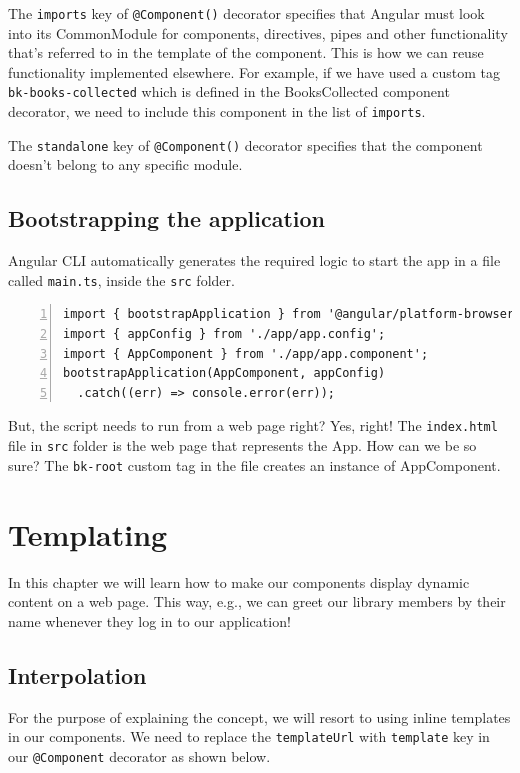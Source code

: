 \documentclass{report}
\begin{document}
The \verb|imports| key of \verb|@Component()| decorator specifies that Angular must look into its CommonModule for components, directives, pipes and other functionality that's referred to in the template of the component. This is how we can reuse functionality implemented elsewhere. For example, if we have used a custom tag \verb|bk-books-collected| which is defined in the BooksCollected component decorator, we need to include this component in the list of \verb|imports|.

The \verb|standalone| key of \verb|@Component()| decorator specifies that the component doesn't belong to any specific module.

\section{Bootstrapping the application}
Angular CLI automatically generates the required logic to start the app in a file called \verb|main.ts|, inside the \verb|src| folder.

\begin{Verbatim}[numbers=left]
import { bootstrapApplication } from '@angular/platform-browser';
import { appConfig } from './app/app.config';
import { AppComponent } from './app/app.component';
bootstrapApplication(AppComponent, appConfig)
  .catch((err) => console.error(err));
\end{Verbatim}

But, the script needs to run from a web page right? Yes, right! The \verb|index.html| file in \verb|src| folder is the web page that represents the App. How can we be so sure? The \verb|bk-root| custom tag in the file creates an instance of AppComponent.


\chapter{Templating}
In this chapter we will learn how to make our components display dynamic content on a web page. This way, e.g., we can greet our library members by their name whenever they log in to our application!

\section{Interpolation}
For the purpose of explaining the concept, we will resort to using inline templates in our components. We need to replace the \verb|templateUrl| with \verb|template| key in our \verb|@Component| decorator as shown below.
 
\end{document}

